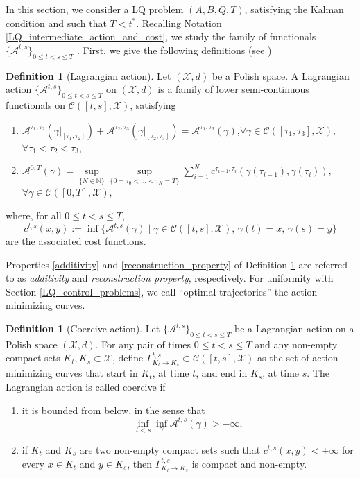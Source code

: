 \documentclass[reqno]{amsart}
\theoremstyle{plain}
\theoremstyle{definition}
\newtheorem{Def}[thm]{Definition}
\theoremstyle{remark}
\begin{document}
In this section, we consider a LQ problem $(A,B,Q,T)$, satisfying the Kalman condition and such that $T<t^*$. Recalling Notation \ref{LQ_intermediate_action_and_cost}, we study the family of functionals $\{\mathcal{A}^{t,s}\}_{0\leq t<s\leq T}$ .
    First, we give the following definitions (see \cite[Definitions 7.11 and 7.13]{Villanioldandnew})
	\begin{Def}[Lagrangian action]\label{Lagrangian_action}
		Let $(\mathcal{X},d)$ be a Polish space. A Lagrangian action $\{\mathcal{A}^{t,s}\}_{0\leq t<s\leq T}$ on $(\mathcal{X},d)$ is a family of lower semi-continuous functionals on $\mathcal{C}([t,s],\mathcal{X})$, satisfying
		\begin{enumerate}
		\item\label{additivity} $\mathcal{A}^{\tau_1,\tau_2}(\gamma|_{[\tau_1,\tau_2]}) + \mathcal{A}^{\tau_2,\tau_3}(\gamma|_{[\tau_2,\tau_3]}) = \mathcal{A}^{\tau_1,\tau_3}(\gamma)$,\qquad $\forall\gamma\in\mathcal{C}([\tau_1,\tau_3],\mathcal{X}),$\quad$\forall \tau_1 < \tau_2 < \tau_3,$
		\item\label{reconstruction_property} $\mathcal{A}^{0,T}(\gamma)=\sup\limits_{\{N\in\mathbb{N}\}}\sup\limits_{\{0=\tau_0<\dots<\tau_N=T\}}\sum_{i=1}^{N}c^{\tau_{i-1},\tau_i}\left(\gamma(\tau_{i-1}),\gamma(\tau_i)\right)$,\quad$\forall\gamma\in\mathcal{C}([0,T],\mathcal{X}),$
		\end{enumerate}
		where, for all $0\leq t<s\leq T$,
		\begin{equation}
			c^{t,s}(x,y):=\inf\{\mathcal{A}^{t,s}(\gamma)\mid \gamma\in \mathcal{C}\left(\left[t,s\right],\mathcal{X}\right), \,  \gamma(t)=x,\, \gamma(s)=y\}	
		\end{equation}
		are the associated cost functions.
	\end{Def}
		Properties \eqref{additivity} and \eqref{reconstruction_property} of Definition \ref{Lagrangian_action} are referred to as \emph{additivity} and \emph{reconstruction property}, respectively. For uniformity with  Section \ref{LQ_control_problems}, we call ``optimal trajectories'' the action-minimizing curves.
	\begin{Def}[Coercive action]\label{Coercive_action}
		Let $\{\mathcal{A}^{t,s}\}_{0\leq t<s\leq T}$ be a Lagrangian action on a Polish space $(\mathcal{X},d)$. For any pair of times $0\leq t<s\leq T$ and any non-empty compact sets $K_t, K_s\subset\mathcal{X}$, define $\Gamma^{t,s}_{K_t\to K_s}\subset\mathcal{C}([t,s],\mathcal{X})$ as the set of action minimizing curves that start in $K_t$, at time $t$, and end in $K_s$, at time $s$. The Lagrangian action is called coercive if 
		\begin{enumerate}
			\item it is bounded from below, in the sense that
			\begin{equation}
				\inf\limits_{t<s}\inf\limits_{\gamma}\mathcal{A}^{t,s}(\gamma)>-\infty,
			\end{equation}
			\item if $K_t$ and $K_s$ are two non-empty compact sets such that $c^{t,s}(x,y)<+\infty$ for every $x\in K_t$ and $y\in K_s$, then $\Gamma^{t,s}_{K_t\to K_s}$ is compact and non-empty.
		\end{enumerate}
	\end{Def}
\end{document}
